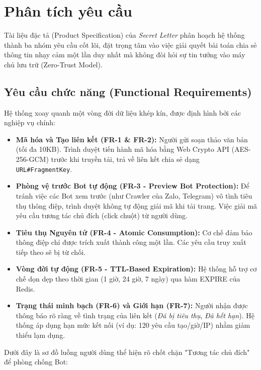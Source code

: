 \section{Phân tích yêu cầu}

Tài liệu đặc tả (Product Specification) của \textit{Secret Letter} phân hoạch hệ thống thành ba nhóm yêu cầu cốt lõi, đặt trọng tâm vào việc giải quyết bài toán chia sẻ thông tin nhạy cảm một lần duy nhất mà không đòi hỏi sự tin tưởng vào máy chủ lưu trữ (Zero-Trust Model).

\subsection{Yêu cầu chức năng (Functional Requirements)}
Hệ thống xoay quanh một vòng đời dữ liệu khép kín, được định hình bởi các nghiệp vụ chính:

\begin{itemize}
    \item \textbf{Mã hóa và Tạo liên kết (FR-1 \& FR-2):} Người gửi soạn thảo văn bản (tối đa 10KB). Trình duyệt tiến hành mã hóa bằng Web Crypto API (AES-256-GCM) trước khi truyền tải, trả về liên kết chia sẻ dạng \texttt{URL\#FragmentKey}.
    \item \textbf{Phòng vệ trước Bot tự động (FR-3 - Preview Bot Protection):} Để tránh việc các Bot xem trước (như Crawler của Zalo, Telegram) vô tình tiêu thụ thông điệp, trình duyệt không tự động giải mã khi tải trang. Việc giải mã yêu cầu tương tác chủ đích (click chuột) từ người dùng.
    \item \textbf{Tiêu thụ Nguyên tử (FR-4 - Atomic Consumption):} Cơ chế đảm bảo thông điệp chỉ được trích xuất thành công một lần. Các yêu cầu truy xuất tiếp theo sẽ bị từ chối.
    \item \textbf{Vòng đời tự động (FR-5 - TTL-Based Expiration):} Hệ thống hỗ trợ cơ chế dọn dẹp theo thời gian (1 giờ, 24 giờ, 7 ngày) qua hàm EXPIRE của Redis.
    \item \textbf{Trạng thái minh bạch (FR-6) và Giới hạn (FR-7):} Người nhận được thông báo rõ ràng về tình trạng của liên kết (\textit{Đã bị tiêu thụ}, \textit{Đã hết hạn}). Hệ thống áp dụng hạn mức kết nối (ví dụ: 120 yêu cầu tạo/giờ/IP) nhằm giảm thiểu lạm dụng.
\end{itemize}

Dưới đây là sơ đồ luồng người dùng thể hiện rõ chốt chặn "Tương tác chủ đích" để phòng chống Bot:

